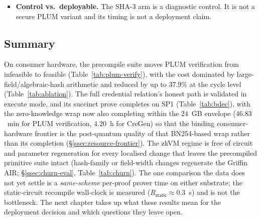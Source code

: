 \begin{itemize}
  \item \textbf{Control vs.\ deployable.} The SHA-3 arm is a diagnostic control. It is not a secure PLUM variant and its timing is not a deployment claim.
\end{itemize}

\subsection{Summary}\label{ssec:eval-summary}
On consumer hardware, the precompile suite moves PLUM verification from infeasible to feasible (Table~\ref{tab:plum-verify}), with the cost dominated by large-field/algebraic-hash arithmetic and reduced by up to $37.9\%$ at the cycle level (Table~\ref{tab:ablation}). The full credential relation's honest path is validated in execute mode, and its succinct prove completes on SP1 (Table~\ref{tab:bdec}), with the zero-knowledge wrap now also completing within the $24$~GB envelope ($46.83$~min for PLUM verification, $4.20$~h for CreGen) so that the binding consumer-hardware frontier is the post-quantum quality of that {BN254}-based wrap rather than its completion (\S\ref{ssec:resource-frontier}). The zkVM regime is free of circuit and parameter regeneration for every localised change that leaves the precompiled primitive suite intact (hash-family or field-width changes regenerate the Griffin AIR; \S\ref{ssec:churn-eval}, Table~\ref{tab:churn}). The one comparison the data does not yet settle is a \emph{same-scheme} per-proof prover time on either substrate; the static-circuit recompile wall-clock is measured ($R_{\mathsf{static}}\approx 0.3$~s) and is not the bottleneck. The next chapter takes up what these results mean for the deployment decision and which questions they leave open.
